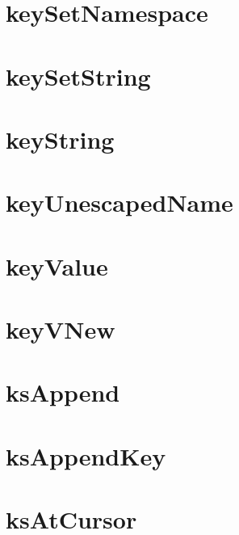 \let\mypdfximage\pdfximage\def\pdfximage{\immediate\mypdfximage}\documentclass[twoside]{book}
\newcommand{\+}{\discretionary{\mbox{\scriptsize$\hookleftarrow$}}{}{}}
\begin{document}
\chapter{key\+Set\+Namespace}
\label{doc_api_review_core_keySetNamespace_md}

\chapter{key\+Set\+String}
\label{doc_api_review_core_keySetString_md}

\chapter{key\+String}
\label{doc_api_review_core_keyString_md}

\chapter{key\+Unescaped\+Name}
\label{doc_api_review_core_keyUnescapedName_md}

\chapter{key\+Value}
\label{doc_api_review_core_keyValue_md}

\chapter{key\+VNew}
\label{doc_api_review_core_keyVNew_md}

\chapter{ks\+Append}
\label{doc_api_review_core_ksAppend_md}

\chapter{ks\+Append\+Key}
\label{doc_api_review_core_ksAppendKey_md}

\chapter{ks\+At\+Cursor}
\label{doc_api_review_core_ksAtCursor_md}

\end{document}
